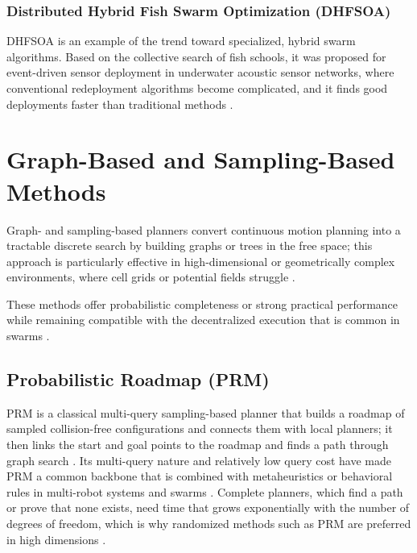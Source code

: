 \subsubsection{Distributed Hybrid Fish Swarm Optimization (DHFSOA)}

DHFSOA is an example of the trend toward specialized, hybrid swarm algorithms.
Based on the collective search of fish schools, it was proposed for event-driven
sensor deployment in underwater acoustic sensor networks, where conventional
redeployment algorithms become complicated, and it finds good deployments faster
than traditional methods \cite{wang2018event}.

\section{Graph-Based and Sampling-Based Methods}\label{sec:graph-sampling}

Graph- and sampling-based planners convert continuous motion planning into a
tractable discrete search by building graphs or trees in the free space; this
approach is particularly effective in high-dimensional or geometrically complex
environments, where cell grids or potential fields struggle \cite{abujabal2024path}.

These methods offer probabilistic completeness or strong practical performance
while remaining compatible with the decentralized execution that is common in
swarms \cite{lin2022review}.

\subsection{Probabilistic Roadmap (PRM)}

PRM is a classical multi-query sampling-based planner that builds a roadmap of
sampled collision-free configurations and connects them with local planners; it
then links the start and goal points to the roadmap and finds a path through
graph search \cite{kavraki1996probabilistic}. Its multi-query nature and
relatively low query cost have made PRM a common backbone that is combined with
metaheuristics or behavioral rules in multi-robot systems and swarms
\cite{neto2017multi,lin2022review}. Complete planners, which find a path or prove
that none exists, need time that grows exponentially with the number of degrees
of freedom, which is why randomized methods such as PRM are preferred in high
dimensions \cite{kavraki1996probabilistic}.

